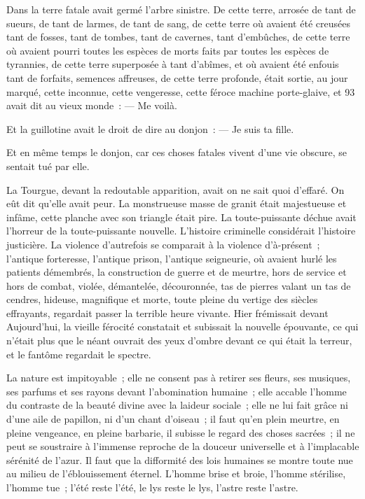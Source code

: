 \documentclass[french,twoside]{book} %
\begin{document}
Dans la terre fatale avait germé l’arbre sinistre. De cette terre, arrosée de tant de sueurs, de tant de larmes, de tant de sang, de cette terre où avaient été creusées tant de fosses, tant de tombes, tant de cavernes, tant d’embûches, de cette terre où avaient pourri toutes les espèces de morts faits par toutes les espèces de tyrannies, de cette terre superposée à tant d’abîmes, et où avaient été enfouis tant de forfaits, semences affreuses, de cette terre profonde, était sortie, au jour marqué, cette inconnue, cette vengeresse, cette féroce machine porte-glaive, et 93 avait dit au vieux monde : — Me voilà.\par
Et la guillotine avait le droit de dire au donjon : — Je suis ta fille.\par
Et en même temps le donjon, car ces choses fatales vivent d’une vie obscure, se sentait tué par elle.\par
La Tourgue, devant la redoutable apparition, avait  on ne sait quoi d’effaré. On eût dit qu’elle avait peur. La monstrueuse masse de granit était majestueuse et infâme, cette planche avec son triangle était pire. La toute-puissante déchue avait l’horreur de la toute-puissante nouvelle. L’histoire criminelle considérait l’histoire justicière. La violence d’autrefois se comparait à la violence d’à-présent ; l’antique forteresse, l’antique prison, l’antique seigneurie, où avaient hurlé les patients démembrés, la construction de guerre et de meurtre, hors de service et hors de combat, violée, démantelée, découronnée, tas de pierres valant un tas de cendres, hideuse, magnifique et morte, toute pleine du vertige des siècles effrayants, regardait passer la terrible heure vivante. Hier frémissait devant Aujourd’hui, la vieille férocité constatait et subissait la nouvelle épouvante, ce qui n’était plus que le néant ouvrait des yeux d’ombre devant ce qui était la terreur, et le fantôme regardait le spectre.\par
La nature est impitoyable ; elle ne consent pas à retirer ses fleurs, ses musiques, ses parfums et ses rayons devant l’abomination humaine ; elle accable l’homme du contraste de la beauté divine avec la laideur sociale ; elle ne lui fait grâce ni d’une aile de papillon, ni d’un chant d’oiseau ; il faut qu’en plein meurtre, en pleine vengeance, en pleine barbarie, il subisse le regard des choses sacrées ; il ne peut se soustraire à l’immense reproche de la douceur universelle et à l’implacable sérénité de l’azur. Il faut que la difformité des lois humaines se montre toute nue au milieu de l’éblouissement éternel. L’homme brise et  broie, l’homme stérilise, l’homme tue ; l’été reste l’été, le lys reste le lys, l’astre reste l’astre.\par
\end{document}
